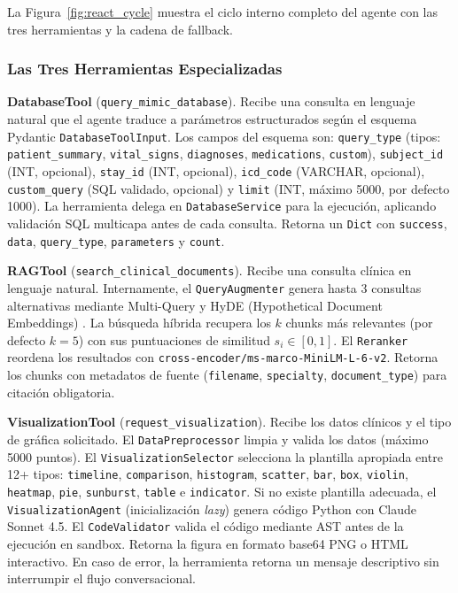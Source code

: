 La Figura~\ref{fig:react_cycle} muestra el ciclo interno completo del agente con las tres herramientas y la cadena de fallback.

\subsubsection{Las Tres Herramientas Especializadas}
\label{sec:herramientas}

\textbf{DatabaseTool} (\texttt{query\_mimic\_database}). Recibe una consulta en lenguaje natural que el agente traduce a parámetros estructurados según el esquema Pydantic \texttt{DatabaseToolInput}. Los campos del esquema son: \texttt{query\_type} (tipos: \texttt{patient\_summary}, \texttt{vital\_signs}, \texttt{diagnoses}, \texttt{medications}, \texttt{custom}), \texttt{subject\_id} (INT, opcional), \texttt{stay\_id} (INT, opcional), \texttt{icd\_code} (VARCHAR, opcional), \texttt{custom\_query} (SQL validado, opcional) y \texttt{limit} (INT, máximo 5000, por defecto 1000). La herramienta delega en \texttt{DatabaseService} para la ejecución, aplicando validación SQL multicapa antes de cada consulta. Retorna un \texttt{Dict} con \texttt{success}, \texttt{data}, \texttt{query\_type}, \texttt{parameters} y \texttt{count}.

\textbf{RAGTool} (\texttt{search\_clinical\_documents}). Recibe una consulta clínica en lenguaje natural. Internamente, el \texttt{QueryAugmenter} genera hasta 3 consultas alternativas mediante Multi-Query y HyDE (Hypothetical Document Embeddings) \citep{Gao2022}. La búsqueda híbrida recupera los $k$ chunks más relevantes (por defecto $k=5$) con sus puntuaciones de similitud $s_i \in [0,1]$. El \texttt{Reranker} reordena los resultados con \texttt{cross-encoder/ms-marco-MiniLM-L-6-v2}. Retorna los chunks con metadatos de fuente (\texttt{filename}, \texttt{specialty}, \texttt{document\_type}) para citación obligatoria.

\textbf{VisualizationTool} (\texttt{request\_visualization}). Recibe los datos clínicos y el tipo de gráfica solicitado. El \texttt{DataPreprocessor} limpia y valida los datos (máximo 5000 puntos). El \texttt{VisualizationSelector} selecciona la plantilla apropiada entre 12+ tipos: \texttt{timeline}, \texttt{comparison}, \texttt{histogram}, \texttt{scatter}, \texttt{bar}, \texttt{box}, \texttt{violin}, \texttt{heatmap}, \texttt{pie}, \texttt{sunburst}, \texttt{table} e \texttt{indicator}. Si no existe plantilla adecuada, el \texttt{VisualizationAgent} (inicialización \textit{lazy}) genera código Python con Claude Sonnet 4.5. El \texttt{CodeValidator} valida el código mediante AST antes de la ejecución en sandbox. Retorna la figura en formato base64 PNG o HTML interactivo. En caso de error, la herramienta retorna un mensaje descriptivo sin interrumpir el flujo conversacional.

